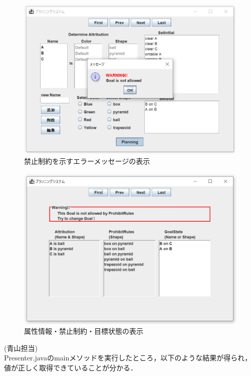 \documentclass[uplatex,12pt]{jsarticle}
\begin{document}
\begin{figure}[htbp]
  \begin{center}
    \includegraphics[scale=0.6]{images/prohibit1.PNG}
    \caption{禁止制約を示すエラーメッセージの表示}
    \label{fig:prohibit1}
  \end{center}
\end{figure}
\begin{figure}[htbp]
  \begin{center}
    \includegraphics[scale=0.6]{images/prohibit2.PNG}
    \caption{属性情報・禁止制約・目標状態の表示}
    \label{fig:prohibit2}
  \end{center}
\end{figure}

\clearpage

\noindent (青山担当) \\
Presenter.javaのmainメソッドを実行したところ，以下のような結果が得られ，値が正しく取得できていることが分かる．
\end{document}
